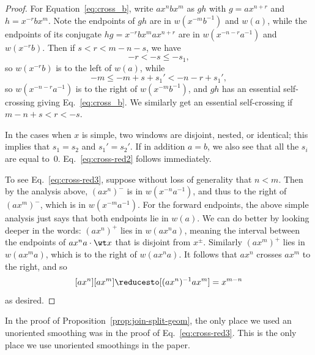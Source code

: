 \begin{proof}
  For Equation~\eqref{eq:cross_b}, write $ax^nbx^m$ as $gh$ with
  $g=ax^{n+r}$ and $h=x^{-r}bx^m$. Note the endpoints of $gh$
  are in $w(x^{-m}b^{-1})$ and $w(a)$, while the endpoints of its
  conjugate $hg =x^{-r}bx^max^{n+r}$ are in $w(x^{-n-r}a^{-1})$ and
  $w(x^{-r}b)$. Then if $s < r < m-n-s$, we have
  \[
    -r < -s \le -s_1,
  \]
  so $w(x^{-r}b)$ is to the left of $w(a)$, while
  \[
    -m \le -m+s+s_1' < -n - r + s_1',
  \]
  so $w(x^{-n-r}a^{-1})$ is to the right of  $w(x^{-m}b^{-1})$, and
  $gh$ has an essential self-crossing giving Eq.~\eqref{eq:cross_b}.
  We similarly get an essential self-crossing if $m-n+s < r < -s$.

  In the cases when $x$ is simple, two windows are disjoint, nested,
  or identical; this implies that $s_1 = s_2$ and $s_1' = s_2'$. If in
  addition $a=b$, we also see that all the $s_i$ are equal to~$0$.
  Eq.~\eqref{eq:cross-red2} follows immediately.

  To see Eq.~\eqref{eq:cross-red3}, suppose without loss of generality
  that $n < m$. Then by the
  analysis above, $(ax^n)^-$ is in $w(x^{-n}a^{-1})$, and thus to the
  right of $(ax^m)^-$, which is in $w(x^{-m}a^{-1})$. For the forward
  endpoints, the above simple analysis just says that both endpoints
  lie in $w(a)$. We can do better by looking deeper in the words:
  $(ax^n)^+$ lies in $w(ax^na)$, meaning the interval between the
  endpoints of $ax^na\cdot\wt x$ that is disjoint from $x^\pm$.
  Similarly $(ax^m)^+$ lies in $w(ax^ma)$, which is to the right of
  $w(ax^na)$. It follows that $ax^n$ crosses $ax^m$ to the right, and
  so
  \[
    [ax^n][ax^m] \reducesto [(ax^n)^{-1}ax^m] = x^{m-n}
  \]
  as desired.
\end{proof}

\begin{remark}
  In the proof of Proposition~\ref{prop:join-split-geom}, the only
  place we used an unoriented smoothing was in the proof of
  Eq.~\eqref{eq:cross-red3}.
  This is the only place we use unoriented smoothings in the paper.
\end{remark}



